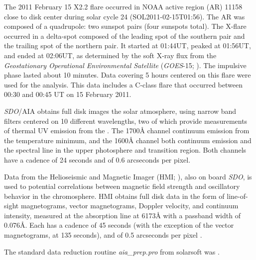 The 2011 February 15 X2.2 flare
occurred in NOAA active region (AR) 11158
close to disk center
during solar cycle 24 (SOL2011-02-15T01:56).
The AR was composed of a quadrupole:
two sunspot pairs (four sunspots total).
The X-flare occurred in a delta-spot composed of
the leading spot of the southern pair and
the trailing spot of the northern pair.
It started at 01:44UT, peaked at 01:56UT, and ended at 02:06UT,
as determined by the soft X-ray flux from the
\textit{Geostationary Operational Environmental Satellite}
(\textit{GOES}-15; \cite{Viereck2007}).
The impulsive phase lasted about 10 minutes.
Data covering 5 hours centered on this flare were used for the analysis.
This data includes a C-class flare that occurred between 00:30 and 00:45 UT
on 15 February 2011.


\textit{SDO}/AIA
obtains full disk images 
the solar atmosphere, using narrow band filters centered on
10 different wavelengths, two of which provide measurements of
thermal UV emission from the .
The 1700\AA{} channel  continuum emission from the
temperature minimum, and
the 1600\AA{} channel 
both continuum emission and the  spectral line in the upper
photosphere and transition region.
Both channels have a cadence of
24 seconds and  of 0.6 arcseconds per pixel.

Data from
the Helioseismic and Magnetic Imager (HMI; \cite{Scherrer2012}),
also on board \textit{SDO}, is used to  potential
correlations between magnetic field strength and oscillatory
behavior in the chromosphere.
HMI obtains full disk data in the form of
line-of-sight magnetograms, vector magnetograms,
Doppler velocity, and continuum intensity,
measured at the  absorption line at 6173\AA{}
with a passband width of 0.076\AA{}.
Each  has a cadence of 45 seconds (with the exception
of the vector magnetograms, at 135 seconds),
and  of 0.5 arcseconds per pixel
\citep{Schou2012}.

The standard data reduction routine
\textit{aia\_prep.pro} from solarsoft was
.

